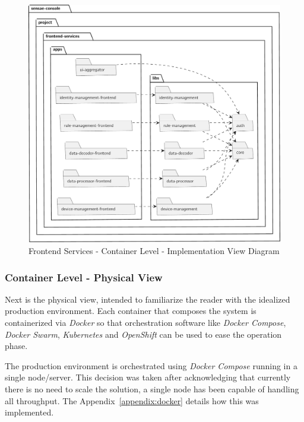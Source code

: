 \begin{figure}[H]
   \centering
   \includegraphics[page=1,width=\columnwidth]{assets/diagrams/design/architectural/level2/development/frontend.pdf}
   \caption[Frontend Services - Container Level - Implementation View Diagram]{Frontend Services - Container Level - Implementation View Diagram}
   \label{fig:design:architecture:platform:container:development:frontend}
\end{figure}

\subsubsection{Container Level - Physical View}
\label{par:design:architecture:platform:container:physical}

Next is the physical view, intended to familiarize the reader with the idealized production environment. Each container that composes the system is containerized via \textit{Docker} so that orchestration software like \textit{Docker Compose}, \textit{Docker Swarm}, \textit{Kubernetes} and \textit{OpenShift} can be used to ease the operation phase.

The production environment is orchestrated using \textit{Docker Compose} running in a single node/server. This decision was taken after acknowledging that currently there is no need to scale the solution, a single node has been capable of handling all throughput.  The Appendix~\ref{appendix:docker} details how this was implemented.

